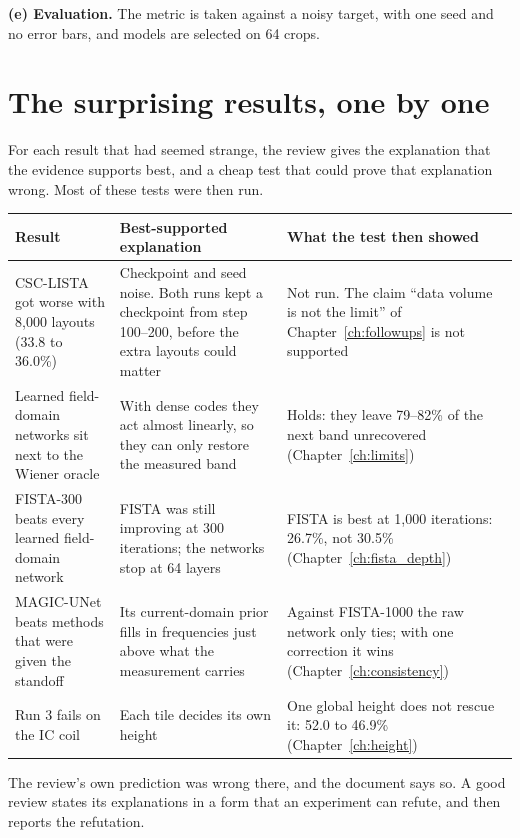\textbf{(e) Evaluation.} The metric is taken against a noisy target, with one seed and no error bars, and models are
selected on 64 crops.

\section{The surprising results, one by one}

For each result that had seemed strange, the review gives the explanation that the evidence supports best, and a cheap
test that could prove that explanation wrong. Most of these tests were then run.

\begin{center}
\small
\begin{tabularx}{\textwidth}{>{\raggedright\arraybackslash}p{3.3cm}>{\raggedright\arraybackslash}X>{\raggedright\arraybackslash}p{4.6cm}}
\toprule
Result & Best-supported explanation & What the test then showed \\
\midrule
CSC-LISTA got worse with 8{,}000 layouts (33.8 to 36.0\%) & Checkpoint and seed noise. Both runs kept a checkpoint from
step 100--200, before the extra layouts could matter & Not run. The claim ``data volume is not the limit'' of
Chapter~\ref{ch:followups} is not supported \\
Learned field-domain networks sit next to the Wiener oracle & With dense codes they act almost linearly, so they can only
restore the measured band & Holds: they leave 79--82\% of the next band unrecovered (Chapter~\ref{ch:limits}) \\
FISTA-300 beats every learned field-domain network & FISTA was still improving at 300 iterations; the networks stop at 64
layers & FISTA is best at 1{,}000 iterations: 26.7\%, not 30.5\% (Chapter~\ref{ch:fista_depth}) \\
MAGIC-UNet beats methods that were given the standoff & Its current-domain prior fills in frequencies just above what
the measurement carries & Against FISTA-1000 the raw network only ties; with one correction it wins
(Chapter~\ref{ch:consistency}) \\
Run 3 fails on the IC coil & Each tile decides its own height & One global height does not rescue it: 52.0 to 46.9\%
(Chapter~\ref{ch:height}) \\
\bottomrule
\end{tabularx}
\end{center}

\begin{keyidea}
The review's own prediction was wrong there, and the document says so. A good review states its explanations in a
form that an experiment can refute, and then reports the refutation.
\end{keyidea}

